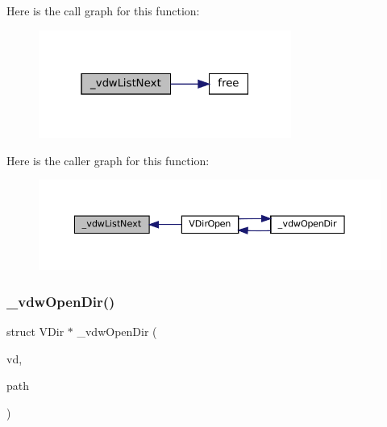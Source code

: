 Here is the call graph for this function\+:
\nopagebreak
\begin{figure}[H]
\begin{center}
\leavevmode
\includegraphics[width=235pt]{vfs-w32_8c_a65c8ce6577ea3b8a6300f2c95ad372ad_cgraph}
\end{center}
\end{figure}
Here is the caller graph for this function\+:
\nopagebreak
\begin{figure}[H]
\begin{center}
\leavevmode
\includegraphics[width=350pt]{vfs-w32_8c_a65c8ce6577ea3b8a6300f2c95ad372ad_icgraph}
\end{center}
\end{figure}
\mbox{\label{vfs-w32_8c_a602c5a9cb86c217774922a5e150e640c}} 
\subsubsection{\texorpdfstring{\+\_\+vdw\+Open\+Dir()}{\_vdwOpenDir()}}
{\footnotesize\ttfamily struct V\+Dir $\ast$ \+\_\+vdw\+Open\+Dir (\begin{DoxyParamCaption}\item[{struct V\+Dir $\ast$}]{vd,  }\item[{const char $\ast$}]{path }\end{DoxyParamCaption})\hspace{0.3cm}{\ttfamily [static]}}

